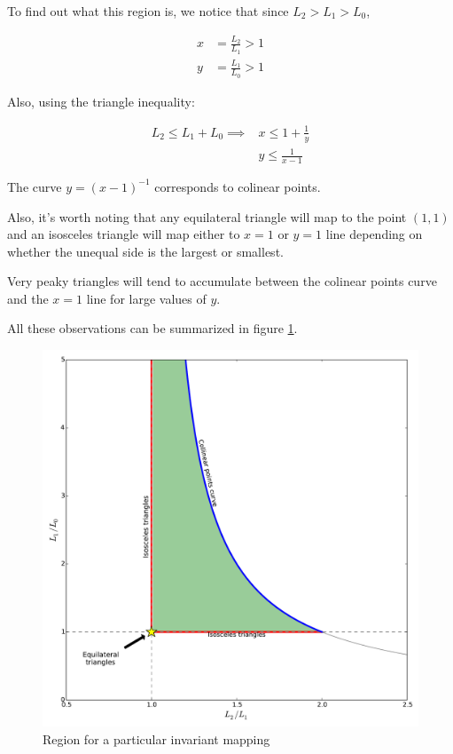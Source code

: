 To find out what this region is, we notice that since $L_2 > L_1 > L_0$,

\begin{align*}
x &=  \frac{L_2}{L_1} > 1 \\
y &=  \frac{L_1}{L_0} > 1
\end{align*}

Also, using the triangle inequality:

\begin{align*}
L_2 \leq L_1 + L_0 \implies & x \leq 1 + \frac{1}{y} \\
& y \leq \frac{1}{x-1}
\end{align*}

The curve $y = (x-1)^{-1}$ corresponds to colinear points.

Also, it's worth noting that any equilateral triangle will map to the point $(1,1)$ and an isosceles triangle will map either to $x=1$ or $y=1$ line depending on whether the unequal side is the largest or smallest.

Very peaky triangles will tend to accumulate between the colinear points curve and the $x=1$ line for large values of $y$.

All these observations can be summarized in figure \ref{fig:inv_region}.

\begin{figure}[htbp]
   \centering
   \includegraphics[width = \linewidth]{chapter_astroalign/figures/invariantMap01.pdf}
   \caption{Region for a particular invariant mapping}
   \label{fig:inv_region}
\end{figure}


